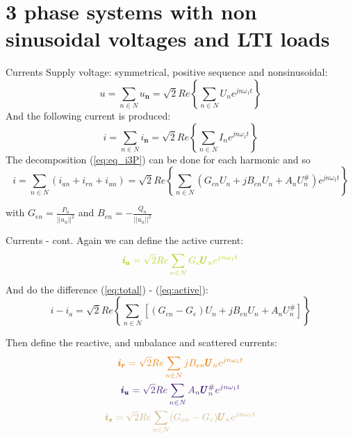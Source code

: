 \documentclass[aspectratio=169]{beamer}
\begin{document}
\section{3 phase systems with non sinusoidal voltages and LTI loads}

  \begin{frame}{Currents}{\insertsection}
    Supply voltage: symmetrical, positive sequence and nonsinusoidal:
    \begin{equation}
      \pmb{\mathit{u}} = \sum_{n\in N} \pmb{\mathit{u}_n} = \sqrt{2}Re\left\{\sum_{n\in N}\pmb{\textit{U}}_ne^{jn\omega_1 t}\right\}
    \end{equation}
And the following current is produced:
    \begin{equation}
      \pmb{\mathit{i}} = \sum_{n\in N} \pmb{\mathit{i}_n} = \sqrt{2}Re\left\{\sum_{n\in N}\pmb{\textit{I}}_ne^{jn\omega_1 t}\right\}
    \end{equation}
The decomposition (\ref{eq:eq_i3P}) can be done for each harmonic and so
\begin{equation}
    \pmb{\mathit{i}} = \sum_{n\in N} \left( \pmb{\mathit{i}}_{an} + \pmb{\mathit{i}}_{rn} + \pmb{\mathit{i}}_{un} \right) = \sqrt{2} Re \left\{ \sum_{n\in N} \left(G_{en}\pmb{\textit{U}}_n + jB_{en}\pmb{\textit{U}}_n + A_n\pmb{\textit{U}}_n^{\#} \right)e^{jn\omega_1 t} \right\}
    \label{eq:total}
\end{equation}

with $G_{en} = \frac{P_n}{||\pmb{\mathit{u}}_n||^2}$ and $B_{en} = -\frac{Q_n}{||\pmb{\mathit{u}}_n||^2}$
\end{frame}

\begin{frame}{Currents - cont.}{\insertsection}
Again we can define the \textcolor{NTNU_green}{active current}:
\begin{equation}
    \textcolor{NTNU_green}{\pmb{i_a} = \sqrt{2}Re\sum_{n\in N}G_e\pmb{U}_n e^{jn\omega_{1} t}}
    \label{eq:active}
\end{equation}
And do the difference (\ref{eq:total}) - (\ref{eq:active}):
\begin{equation}
    \pmb{\mathit{i}}-\pmb{\mathit{i_a}} = \sqrt{2}Re\left\{\sum_{n\in N} \left[ (G_{en} - G_e)\pmb{\textit{U}}_n + jB_{en} \pmb{\textit{U}}_n + A_n \pmb{\textit{U}}^{\#}_n \right]\right\}
\end{equation}

Then define the \textcolor{NTNU_orange}{reactive}, and \textcolor{NTNU_purple}{unbalance}  and \textcolor{NTNU_sand}{scattered} currents:
    \begin{gather}
      \textcolor{NTNU_orange}{\pmb{i_r} = \sqrt{2}Re\sum_{n\in N}jB_{en}\pmb{U}_n e^{jn\omega_{1} t}}\\
      \textcolor{NTNU_purple}{\pmb{i_u} = \sqrt{2}Re\sum_{n\in N}A_{n}\pmb{U}_{n}^{\#} e^{jn\omega_{1} t}}\\
      \textcolor{NTNU_sand}{\pmb{i_s} = \sqrt{2}Re\sum_{n\in N}(G_{en} - G_e)\pmb{U}_n e^{jn\omega_{1} t}}
    \end{gather}

  \end{frame}
\end{document}
